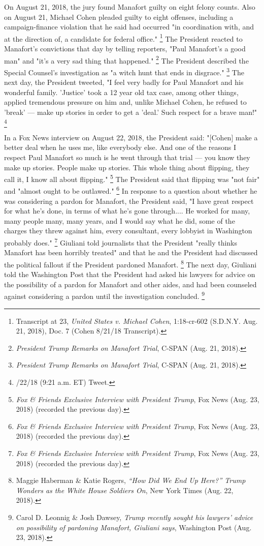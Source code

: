 On August 21, 2018, the jury found Manafort guilty on eight felony counts.
Also on August 21, Michael Cohen pleaded guilty to eight offenses, including a campaign-finance violation that he said had occurred "in coordination with, and at the direction of, a candidate for federal office."%
\footnote{Transcript at 23, \textit{United States v. Michael Cohen}, 1:18-cr-602 (S.D.N.Y. Aug. 21, 2018), Doc. 7 (Cohen 8/21/18 Transcript).}
The President reacted to Manafort's convictions that day by telling reporters, "Paul Manafort's a good man" and "it's a very sad thing that happened."%
\footnote{\textit{President Trump Remarks on Manafort Trial}, C-SPAN (Aug. 21, 2018).}
The President described the Special Counsel's investigation as "a witch hunt that ends in disgrace."%
\footnote{\textit{President Trump Remarks on Manafort Trial}, C-SPAN (Aug. 21, 2018).}
The next day, the President tweeted, "I feel very badly for Paul Manafort and his wonderful family.
'Justice' took a 12 year old tax case, among other things, applied tremendous pressure on him and, unlike Michael Cohen, he refused to 'break' — make up stories in order to get a 'deal.'
Such respect for a brave man!"%
\footnote{/22/18 (9:21 a.m. ET) Tweet.}

In a Fox News interview on August 22, 2018, the President said: "[Cohen] make a better deal when he uses me, like everybody else.
And one of the reasons I respect Paul Manafort so much is he went through that trial — you know they make up stories.
People make up stories.
This whole thing about flipping, they call it, I know all about flipping."%
\footnote{\textit{Fox \& Friends Exclusive Interview with President Trump}, Fox News (Aug. 23, 2018) (recorded the previous day).}
The President said that flipping was "not fair" and "almost ought to be outlawed."%
\footnote{\textit{Fox \& Friends Exclusive Interview with President Trump}, Fox News (Aug. 23, 2018) (recorded the previous day).}
In response to a question about whether he was considering a pardon for Manafort, the President said, "I have great respect for what he's done, in terms of what he's gone through....
He worked for many, many people many, many years, and I would say what he did, some of the charges they threw against him, every consultant, every lobbyist in Washington probably does."%
\footnote{\textit{Fox \& Friends Exclusive Interview with President Trump}, Fox News (Aug. 23, 2018) (recorded the previous day).}
Giuliani told journalists that the President "really thinks Manafort has been horribly treated" and that he and the President had discussed the political fallout if the President pardoned Manafort.%
\footnote{Maggie Haberman \& Katie Rogers, \textit{“How Did We End Up Here?” Trump Wonders as the White House Soldiers On}, New York Times (Aug. 22, 2018).}
The next day, Giuliani told the Washington Post that the President had asked his lawyers for advice on the possibility of a pardon for Manafort and other aides, and had been counseled against considering a pardon until the investigation concluded.%
\footnote{Carol D. Leonnig \& Josh Dawsey, \textit{Trump recently sought his lawyers’ advice on possibility of pardoning Manafort, Giuliani says}, Washington Post (Aug. 23, 2018).}

